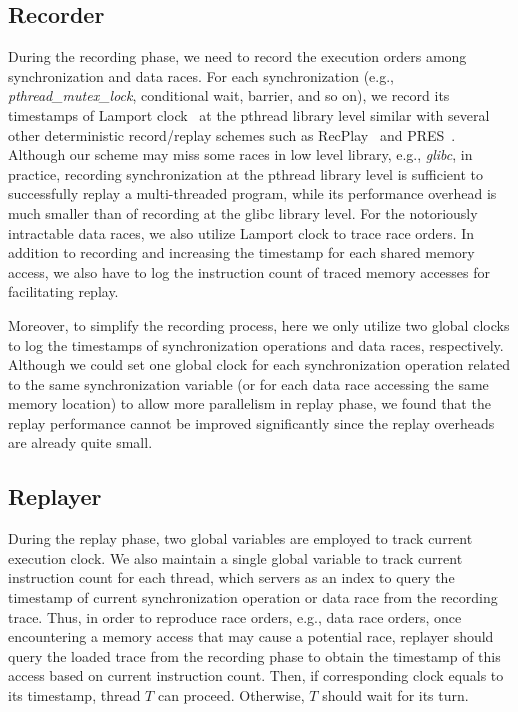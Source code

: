 \documentclass[10pt,onecolumn,letterpaper]{article}
\begin{document}
\subsection{Recorder}
During the recording phase, we need to record the execution orders
among synchronization and data races. For each synchronization
(e.g., \emph{pthread\_mutex\_lock}, conditional wait, barrier, and
so on), we record its timestamps of Lamport
clock~\cite{Lamport78CACM} at the pthread library level similar with
several other deterministic record/replay schemes such as
RecPlay~\cite{Ronsse99TCS} and PRES~\cite{Park09SOSP}. Although our
scheme may miss some races in low level library, e.g., \emph{glibc},
in practice, recording synchronization at the pthread library level
is sufficient to successfully replay a multi-threaded program, while
its performance overhead is much smaller than of recording at the
glibc library level. For the notoriously intractable data races, we
also utilize Lamport clock to trace race orders. In addition to
recording and increasing the timestamp for each shared memory
access, we also have to log the instruction count of traced memory
accesses for facilitating replay.

Moreover, to simplify the recording process, here we only utilize
two global clocks to log the timestamps of synchronization
operations and data races, respectively. Although we could set one
global clock for each synchronization operation related to the same
synchronization variable (or for each data race accessing the same
memory location) to allow more parallelism in replay phase, we found
that the replay performance cannot be improved significantly since
the replay overheads are already quite small.


\subsection{Replayer}


During the replay phase, two global variables are employed to track
current execution clock. We also maintain a single global variable
to track current instruction count for each thread, which servers as
an index to query the timestamp of current synchronization operation
or data race from the recording trace. Thus, in order to reproduce
race orders, e.g., data race orders, once encountering a memory
access that may cause a potential race, replayer should query the
loaded trace from the recording phase to obtain the timestamp of
this access based on current instruction count. Then, if
corresponding clock equals to its timestamp, thread $T$ can proceed.
Otherwise, $T$ should wait for its turn.
\end{document}
